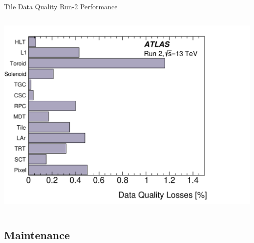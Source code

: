 \documentclass[aspectratio=169,xcolor=table]{beamer}
\begin{document}
\begin{frame}[t]{Tile Data Quality Run-2 Performance}
\begin{columns}
          \includegraphics[height=.3\textheight,keepaspectratio=true]{DataQualityLosesRun2.png}
        \end{columns}
    \end{frame}

  \subsection{Maintenance }
\end{document}
